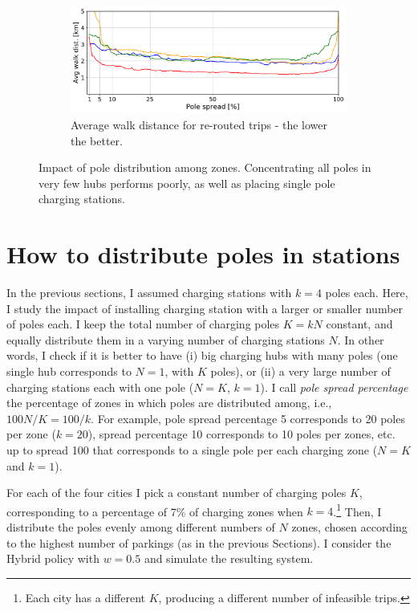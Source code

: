 \begin{figure}[t!]
\begin{center}
\begin{subfigure}{0.49\textwidth}
             \label{fig:zoneACS_vs_Reroute}
         \end{subfigure}        
         \begin{subfigure}{0.49\textwidth}
            \includegraphics[width=\columnwidth]{figures/50_AvgWalkedDistance_vsZones_ACS.pdf}
             \caption{Average walk distance for re-routed trips - the lower the better.}
             \label{fig:zoneACS_vs_awd}
         \end{subfigure}
         \caption{Impact of pole distribution among zones. Concentrating all poles in very few hubs performs poorly, as well as placing single pole charging stations.}
         \label{fig:zoneACS}
\end{center}
\end{figure}

\section{How to distribute poles in stations}
\label{sec:resPoles}

In the previous sections, I assumed charging stations with $k=4$ poles each. Here, I study the impact of installing charging station with a larger or smaller number of poles each. I keep the total number of charging poles $K=kN$ constant, and equally distribute them in a varying number of charging stations $N$. In other words, I check if it is better to have (i) big charging hubs with many poles (one single hub corresponds to $N=1$, with $K$ poles), or (ii) a very large number of charging stations each with one pole ($N=K$, $k=1$).
I call {\it pole spread percentage} the percentage of zones in which poles are distributed among, i.e., $100N/K = 100/k$. For example, pole spread percentage 5 corresponds to 20 poles per zone ($k=20$), spread percentage 10 corresponds to 10 poles per zones, etc. up to spread 100 that corresponds to a single pole per each charging zone ($N=K$ and $k=1$).

For each of the four cities I pick a constant number of charging poles $K$, corresponding to a percentage of 7\% of charging zones when $k=4$.\footnote{Each city has a different $K$, producing a different number of infeasible trips.} Then, I distribute the poles evenly among different numbers of $N$ zones, chosen according to the highest number of parkings (as in the previous Sections). 
I consider the Hybrid policy with $w=0.5$ and simulate the  resulting system. 

